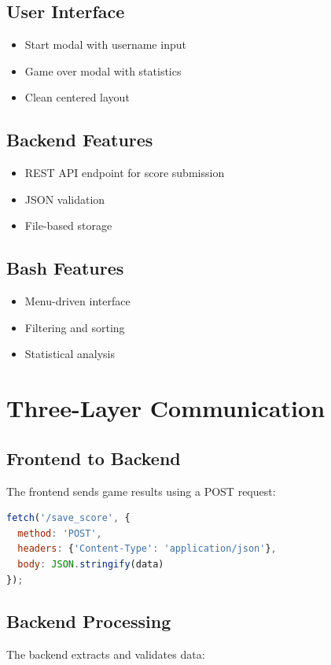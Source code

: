 \documentclass[12pt]{article}
\begin{document}
\subsection{User Interface}
\begin{itemize}
    \item Start modal with username input
    \item Game over modal with statistics
    \item Clean centered layout
\end{itemize}

\subsection{Backend Features}
\begin{itemize}
    \item REST API endpoint for score submission
    \item JSON validation
    \item File-based storage
\end{itemize}

\subsection{Bash Features}
\begin{itemize}
    \item Menu-driven interface
    \item Filtering and sorting
    \item Statistical analysis
\end{itemize}

\section{Three-Layer Communication}

\subsection{Frontend to Backend}
The frontend sends game results using a POST request:

\begin{lstlisting}[language=JavaScript]
fetch('/save_score', {
  method: 'POST',
  headers: {'Content-Type': 'application/json'},
  body: JSON.stringify(data)
});
\end{lstlisting}

\subsection{Backend Processing}
The backend extracts and validates data:
\end{document}
